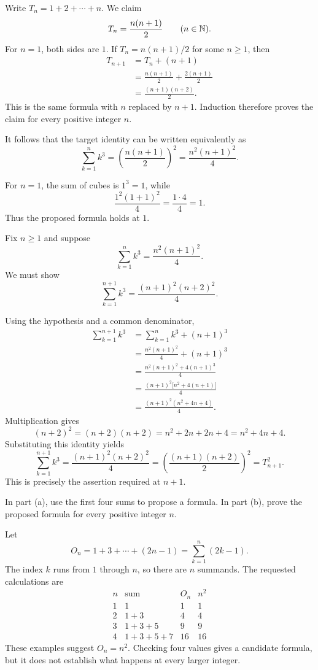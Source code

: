 Write $T_n=1+2+\cdots+n$. We claim
\[
 T_n=\frac{n(n+1)}{2}\qquad(n\in\mathbb{N}).
\]
For $n=1$, both sides are $1$. If
$T_n=n(n+1)/2$ for some $n\geq1$, then
\begin{align*}
 T_{n+1}
 &=T_n+(n+1)\\
 &=\frac{n(n+1)}{2}+\frac{2(n+1)}{2}\\
 &=\frac{(n+1)(n+2)}{2}.
\end{align*}
This is the same formula with $n$ replaced by $n+1$. Induction therefore
proves the claim for every positive integer $n$.

It follows that the target identity can be written equivalently as
\[
 \sum_{k=1}^{n} k^3
 =\left(\frac{n(n+1)}{2}\right)^2
 =\frac{n^2(n+1)^2}{4}.
\]

For $n=1$, the sum of cubes is $1^3=1$, while
\[
 \frac{1^2(1+1)^2}{4}=
 \frac{1\cdot4}{4}=1.
\]
Thus the proposed formula holds at $1$.

Fix $n\geq1$ and suppose
\[
 \sum_{k=1}^{n} k^3=\frac{n^2(n+1)^2}{4}.
\]
We must show
\[
 \sum_{k=1}^{n+1} k^3
 =\frac{(n+1)^2(n+2)^2}{4}.
\]

Using the hypothesis and a common denominator,
\begin{align*}
 \sum_{k=1}^{n+1}k^3
 &=\sum_{k=1}^{n}k^3+(n+1)^3\\
 &=\frac{n^2(n+1)^2}{4}+(n+1)^3\\
 &=\frac{n^2(n+1)^2+4(n+1)^3}{4}\\
 &=\frac{(n+1)^2\bigl[n^2+4(n+1)\bigr]}{4}\\
 &=\frac{(n+1)^2(n^2+4n+4)}{4}.
\end{align*}
Multiplication gives
\[
 (n+2)^2=(n+2)(n+2)
 =n^2+2n+2n+4=n^2+4n+4.
\]
Substituting this identity yields
\[
 \sum_{k=1}^{n+1}k^3
 =\frac{(n+1)^2(n+2)^2}{4}
 =\left(\frac{(n+1)(n+2)}{2}\right)^2
 =T_{n+1}^2.
\]
This is precisely the assertion required at $n+1$.



\goal In part (a), use the first four sums to propose a formula. In
part (b), prove the proposed formula for every positive integer $n$.

Let
\[
 O_n=1+3+\cdots+(2n-1)=\sum_{k=1}^{n}(2k-1).
\]
The index $k$ runs from $1$ through $n$, so there are $n$ summands.
The requested calculations are
\[
\begin{array}{c|l|c|c}
 n&\text{sum}&O_n&n^2\\ \hline
 1&1&1&1\\
 2&1+3&4&4\\
 3&1+3+5&9&9\\
 4&1+3+5+7&16&16
\end{array}
\]
These examples suggest $O_n=n^2$. Checking four values gives a candidate
formula, but it does not establish what happens at every larger integer.

